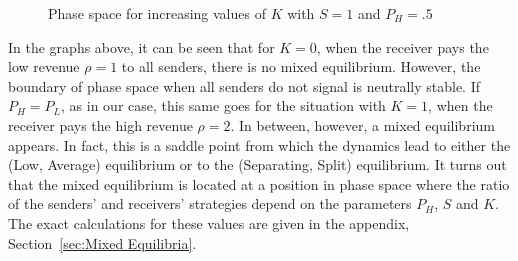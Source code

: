 \documentclass[a4paper,10pt]{article}
\numberwithin{equation}{section}
\begin{document}
\begin{figure}[h]
\begin{center}
\hfill
{}
\hfill
{}
\end{center}
\caption{Phase space for increasing values of $K$ with $S=1$ and $P_H=.5$}
\label{fig:Graph7.png, fig:Graph8.png, fig:Graph9.png, fig:Graph10.png and fig:Graph11.png}
\end{figure}

In the graphs above, it can be seen that for $K=0$, when the receiver pays the low revenue $\rho=1$ to all senders, there is no mixed equilibrium. However, the boundary of phase space when all senders do not signal is neutrally stable. If $P_H=P_L$, as in our case, this same goes for the situation with $K=1$, when the receiver pays the high revenue $\rho=2$. In between, however, a mixed equilibrium appears. In fact, this is a saddle point from which the dynamics lead to either the (Low, Average) equilibrium or to the (Separating, Split) equilibrium. It turns out that the mixed equilibrium is located at a position in phase space where the ratio of the senders' and receivers' strategies depend on the parameters $P_H$, $S$ and $K$. The exact calculations for these values are given in the appendix, Section~\ref{sec:Mixed Equilibria}.
\end{document}
